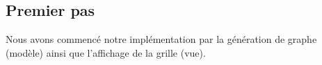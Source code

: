 \documentclass[a4paper]{article}
\begin{document}
\subsection{Premier pas}
Nous avons commencé notre implémentation par la génération de graphe (modèle)
ainsi que l'affichage de la grille (vue).

%

%

\end{document}
